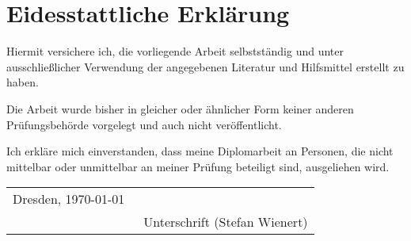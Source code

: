 

\chapter*{Eidesstattliche Erklärung}
	Hiermit versichere ich, die vorliegende Arbeit selbstständig und unter ausschließlicher Verwendung
	der angegebenen Literatur und Hilfsmittel erstellt zu haben.

	Die Arbeit wurde bisher in gleicher oder ähnlicher Form keiner anderen Prüfungsbehörde vorgelegt
	und auch nicht veröffentlicht.\bigskip

Ich erkläre mich einverstanden, dass meine Diplomarbeit an Personen, die nicht mittelbar oder unmittelbar an meiner Prüfung beteiligt sind, ausgeliehen wird.\bigskip

\begin{tabular}{ll}

	Dresden, \today & \underline{\qquad \qquad \qquad \qquad \qquad \qquad}\\
	& \small{\ Unterschrift (Stefan Wienert)}
\end{tabular}

